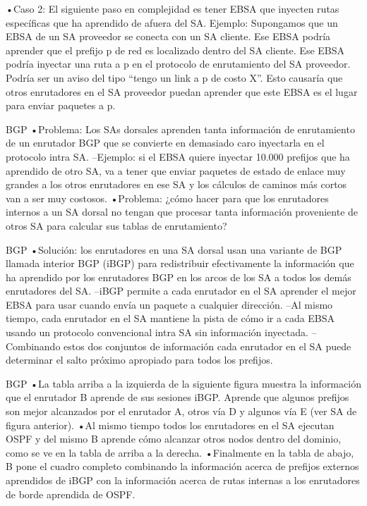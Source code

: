 \documentclass[10pt,a4paper]{report}
\begin{document}
•Caso 2: El siguiente paso en complejidad es tener EBSA que inyecten rutas específicas que ha aprendido de afuera del SA. Ejemplo: Supongamos que un EBSA de un SA proveedor se conecta con un SA cliente. Ese EBSA podría aprender que el prefijo p de red es localizado dentro del SA cliente. Ese EBSA podría inyectar una ruta a p en el protocolo de enrutamiento del SA proveedor. Podría ser un aviso del tipo “tengo un link a p de costo X”. Esto causaría que otros enrutadores en el SA proveedor puedan aprender que este EBSA es el lugar para enviar paquetes a p.




BGP
•Problema: Los SAs dorsales aprenden tanta información de enrutamiento de un enrutador BGP que se convierte en demasiado caro inyectarla en el protocolo intra SA.
–Ejemplo: si el EBSA quiere inyectar 10.000 prefijos que ha aprendido de otro SA, va a tener que enviar paquetes de estado de enlace muy grandes a los otros enrutadores en ese SA y los cálculos de caminos más cortos van a ser muy costosos.
•Problema: ¿cómo hacer para que los enrutadores internos a un SA dorsal no tengan que procesar tanta información proveniente de otros SA para calcular sus tablas de enrutamiento?




BGP
•Solución: los enrutadores en una SA dorsal usan una variante de BGP llamada interior BGP (iBGP) para redistribuir efectivamente la información que ha aprendido por los enrutadores BGP en los arcos de los SA a todos los demás enrutadores del SA.
–iBGP permite a cada enrutador en el SA aprender el mejor EBSA para usar cuando envía un paquete a cualquier dirección.
–Al mismo tiempo, cada enrutador en el SA mantiene la pista de cómo ir a cada EBSA usando un protocolo convencional intra SA sin información inyectada.
–Combinando estos dos conjuntos de información cada enrutador en el SA puede determinar el salto próximo apropiado para todos los prefijos.




BGP
•La tabla arriba a la izquierda de la siguiente figura muestra la información que el enrutador B aprende de sus sesiones iBGP. Aprende que algunos prefijos son mejor alcanzados por el enrutador A, otros vía D y algunos vía E (ver SA de figura anterior).
•Al mismo tiempo todos los enrutadores en el SA ejecutan OSPF y del mismo B aprende cómo alcanzar otros nodos dentro del dominio, como se ve en la tabla de arriba a la derecha.
•Finalmente en la tabla de abajo, B pone el cuadro completo combinando la información acerca de prefijos externos aprendidos de iBGP con la información acerca de rutas internas a los enrutadores de borde aprendida de OSPF.
\end{document}
